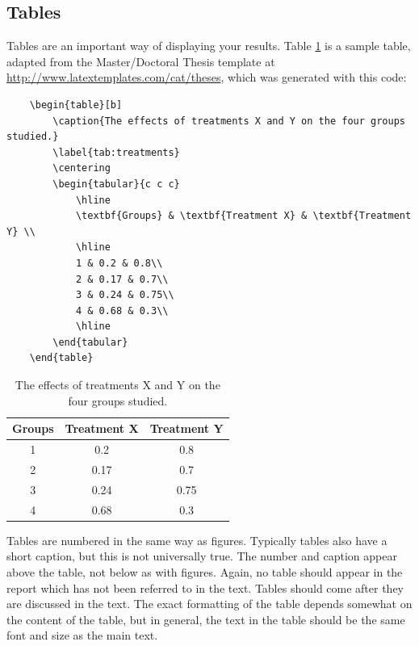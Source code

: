 \subsection{Tables}
Tables are an important way of displaying your results. Table \ref{tab:treatments} is a sample table, adapted from the Master/Doctoral Thesis template at \url{http://www.latextemplates.com/cat/theses}, which was generated with this code:


\begin{verbatim}
	\begin{table}[b]
		\caption{The effects of treatments X and Y on the four groups studied.}
		\label{tab:treatments}
		\centering
		\begin{tabular}{c c c}
			\hline
			\textbf{Groups} & \textbf{Treatment X} & \textbf{Treatment Y} \\
			\hline
			1 & 0.2 & 0.8\\
			2 & 0.17 & 0.7\\
			3 & 0.24 & 0.75\\
			4 & 0.68 & 0.3\\
			\hline
		\end{tabular}
	\end{table}
\end{verbatim}


\begin{table}[b]
	\caption{The effects of treatments X and Y on the four groups studied.}
	\label{tab:treatments}
	\centering
	\setlength{\tabcolsep}{20pt}
	\renewcommand{\arraystretch}{1.5}
	\begin{tabular}{c c c}
		\hline
		\textbf{Groups} & \textbf{Treatment X} & \textbf{Treatment Y} \\
		\hline
		1 & 0.2 & 0.8\\
		2 & 0.17 & 0.7\\
		3 & 0.24 & 0.75\\
		4 & 0.68 & 0.3\\
		\hline
	\end{tabular}
\end{table}

Tables are numbered in the same way as figures. Typically tables also have a short caption, but this is not universally true. The number and caption appear above the table, not below as with figures. Again, no table should appear in the report which has not been referred to in the text. Tables should come after they are discussed in the text. The exact formatting of the table depends somewhat on the content of the table, but in general, the text in the table should be the same font and size as the main text. 

